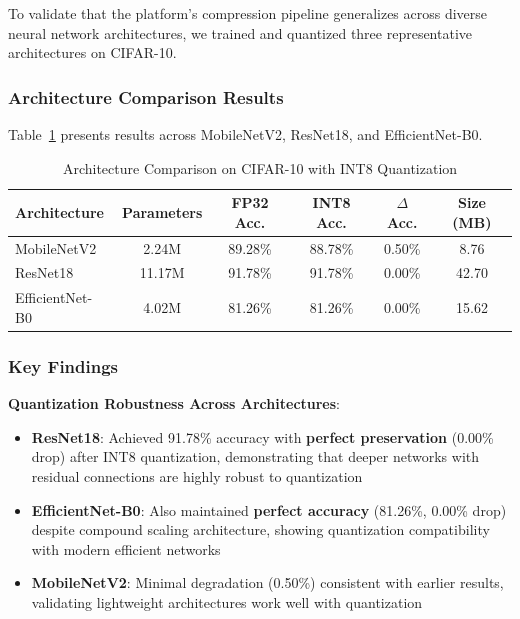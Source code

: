 To validate that the platform's compression pipeline generalizes across diverse neural network architectures, we trained and quantized three representative architectures on CIFAR-10.

\subsubsection{Architecture Comparison Results}

Table~\ref{tab:architecture_comparison} presents results across MobileNetV2, ResNet18, and EfficientNet-B0.

\begin{table}[h]
\centering
\caption{Architecture Comparison on CIFAR-10 with INT8 Quantization}
\label{tab:architecture_comparison}
\begin{tabular}{lccccc}
\hline
\textbf{Architecture} & \textbf{Parameters} & \textbf{FP32 Acc.} & \textbf{INT8 Acc.} & \textbf{$\Delta$ Acc.} & \textbf{Size (MB)} \\
\hline
MobileNetV2 & 2.24M & 89.28\% & 88.78\% & 0.50\% & 8.76 \\
ResNet18 & 11.17M & 91.78\% & 91.78\% & 0.00\% & 42.70 \\
EfficientNet-B0 & 4.02M & 81.26\% & 81.26\% & 0.00\% & 15.62 \\
\hline
\end{tabular}
\end{table}

\subsubsection{Key Findings}

\textbf{Quantization Robustness Across Architectures}:
\begin{itemize}
\item \textbf{ResNet18}: Achieved 91.78\% accuracy with \textbf{perfect preservation} (0.00\% drop) after INT8 quantization, demonstrating that deeper networks with residual connections are highly robust to quantization

\item \textbf{EfficientNet-B0}: Also maintained \textbf{perfect accuracy} (81.26\%, 0.00\% drop) despite compound scaling architecture, showing quantization compatibility with modern efficient networks

\item \textbf{MobileNetV2}: Minimal degradation (0.50\%) consistent with earlier results, validating lightweight architectures work well with quantization
\end{itemize}

